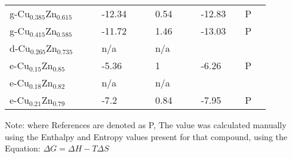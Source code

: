 \begin{landscape}
\begin{center}
\begin{longtable}{|l|p{2.5cm}|l|p{2.5cm}|l|l|p{2.5cm}|l|l|p{2.5cm}|l|l|l|}
g-Cu$_{0.385}$Zn$_{0.615}$  &            &                     & -12.34  &  & \citep{KubaschewskiCatterallJohnAshley.1956} & 0.54   &  & \citep{KubaschewskiCatterallJohnAshley.1956} & -12.83  &  & P                    \\
g-Cu$_{0.415}$Zn$_{0.585 }$ &            &                     & -11.72  &  & \citep{KubaschewskiCatterallJohnAshley.1956} & 1.46   &  & \citep{KubaschewskiCatterallJohnAshley.1956} & -13.03  &  & P                    \\
d-Cu$_{0.265}$Zn$_{0.735}$  &            &                     & n/a     &  & \citep{KubaschewskiCatterallJohnAshley.1956} & n/a    &  & \citep{KubaschewskiCatterallJohnAshley.1956} &         &  &                      \\
e-Cu$_{0.15}$Zn$_{0.85 }$   &            &                     & -5.36   &  & \citep{KubaschewskiCatterallJohnAshley.1956} & 1      &  & \citep{KubaschewskiCatterallJohnAshley.1956} & -6.26   &  & P                    \\
e-Cu$_{0.18}$Zn$_{0.82}$    &            &                     & n/a     &  & \citep{KubaschewskiCatterallJohnAshley.1956} & n/a    &  & \citep{KubaschewskiCatterallJohnAshley.1956} &         &  &                      \\
e-Cu$_{0.21}$Zn$_{0.79}$    &            &                     & -7.2    &  & \citep{KubaschewskiCatterallJohnAshley.1956} & 0.84   &  & \citep{KubaschewskiCatterallJohnAshley.1956} & -7.95   &  & P                   



\end{longtable}
\end{center}
\end{landscape}
Note: where References are denoted as P, The value was calculated manually using the Enthalpy and Entropy values present for that compound, using the Equation: $\Delta G = \Delta H - T \Delta S$